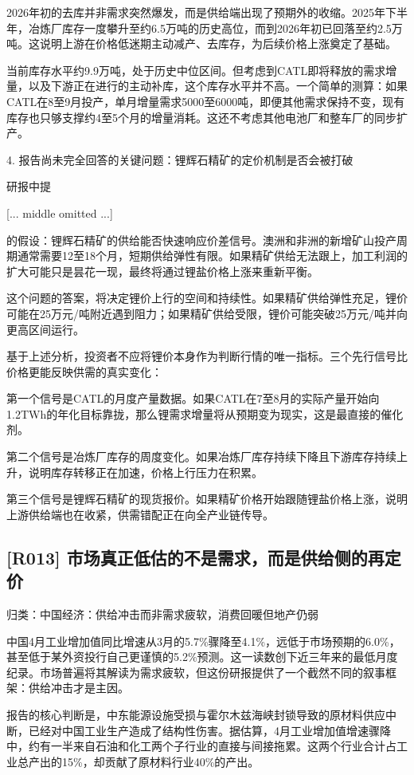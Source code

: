 \documentclass[11pt]{ctexart}
\begin{document}
2026年初的去库并非需求突然爆发，而是供给端出现了预期外的收缩。2025年下半年，冶炼厂库存一度攀升至约6.5万吨的历史高位，而到2026年初已回落至约2.5万吨。这说明上游在价格低迷期主动减产、去库存，为后续价格上涨奠定了基础。

当前库存水平约9.9万吨，处于历史中位区间。但考虑到CATL即将释放的需求增量，以及下游正在进行的主动补库，这个库存水平并不高。一个简单的测算：如果CATL在8至9月投产，单月增量需求5000至6000吨，即便其他需求保持不变，现有库存也只够支撑约4至5个月的增量消耗。这还不考虑其他电池厂和整车厂的同步扩产。

4. 报告尚未完全回答的关键问题：锂辉石精矿的定价机制是否会被打破

研报中提

[... middle omitted ...]

的假设：锂辉石精矿的供给能否快速响应价差信号。澳洲和非洲的新增矿山投产周期通常需要12至18个月，短期供给弹性有限。如果精矿供给无法跟上，加工利润的扩大可能只是昙花一现，最终将通过锂盐价格上涨来重新平衡。

这个问题的答案，将决定锂价上行的空间和持续性。如果精矿供给弹性充足，锂价可能在25万元/吨附近遇到阻力；如果精矿供给受限，锂价可能突破25万元/吨并向更高区间运行。

基于上述分析，投资者不应将锂价本身作为判断行情的唯一指标。三个先行信号比价格更能反映供需的真实变化：

第一个信号是CATL的月度产量数据。如果CATL在7至8月的实际产量开始向1.2TWh的年化目标靠拢，那么锂需求增量将从预期变为现实，这是最直接的催化剂。

第二个信号是冶炼厂库存的周度变化。如果冶炼厂库存持续下降且下游库存持续上升，说明库存转移正在加速，价格上行压力在积累。

第三个信号是锂辉石精矿的现货报价。如果精矿价格开始跟随锂盐价格上涨，说明上游供给端也在收紧，供需错配正在向全产业链传导。

\subsection{[R013] 市场真正低估的不是需求，而是供给侧的再定价}
{\small\color{refgray}归类：中国经济：供给冲击而非需求疲软，消费回暖但地产仍弱}

中国4月工业增加值同比增速从3月的5.7\%骤降至4.1\%，远低于市场预期的6.0\%，甚至低于某外资投行自己更谨慎的5.2\%预测。这一读数创下近三年来的最低月度纪录。市场普遍将其解读为需求疲软，但这份研报提供了一个截然不同的叙事框架：供给冲击才是主因。

报告的核心判断是，中东能源设施受损与霍尔木兹海峡封锁导致的原材料供应中断，已经对中国工业生产造成了结构性伤害。据估算，4月工业增加值增速骤降中，约有一半来自石油和化工两个子行业的直接与间接拖累。这两个行业合计占工业总产出的15\%，却贡献了原材料行业40\%的产出。
\end{document}
